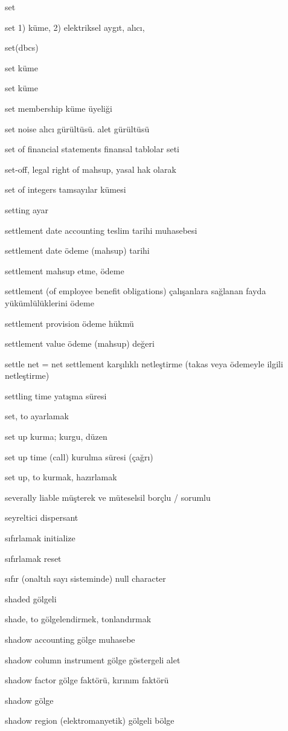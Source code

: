 \documentclass[12pt,fleqn]{article}\usepackage{../../common}
\begin{document}
set

set 1) küme, 2) elektriksel aygıt, alıcı,

set(dbcs)

set küme

set küme

set membership küme üyeliği

set noise alıcı gürültüsü. alet gürültüsü

set of financial statements finansal tablolar seti

set-off, legal right of mahsup, yasal hak olarak

set of integers tamsayılar kümesi

setting ayar

settlement date accounting teslim tarihi muhasebesi

settlement date ödeme (mahsup) tarihi

settlement mahsup etme, ödeme

settlement (of employee benefit obligations) çalışanlara sağlanan fayda yükümlülüklerini ödeme

settlement provision ödeme hükmü

settlement value ödeme (mahsup) değeri

settle net = net settlement karşılıklı netleştirme (takas veya ödemeyle ilgili netleştirme)

settling time yatışma süresi

set, to ayarlamak

set up kurma; kurgu, düzen

set up time (call) kurulma süresi (çağrı)

set up, to kurmak, hazırlamak

severally liable müşterek ve müteselsil borçlu / sorumlu

seyreltici dispersant

sıfırlamak initialize

sıfırlamak reset

sıfır (onaltılı sayı sisteminde) null character

shaded gölgeli

shade, to gölgelendirmek, tonlandırmak

shadow accounting gölge muhasebe

shadow column instrument gölge göstergeli alet

shadow factor gölge faktörü, kırınım faktörü

shadow gölge

shadow region (elektromanyetik) gölgeli bölge
\end{document}
